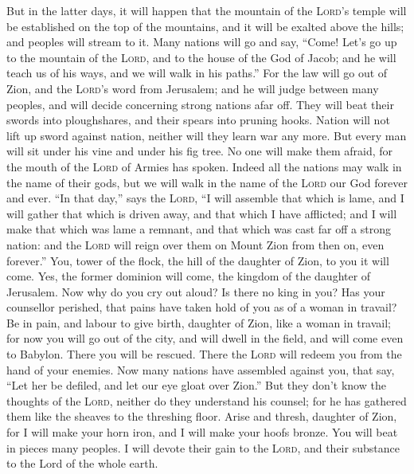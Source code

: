  But in the latter days, it will happen that the mountain
of the \textsc{Lord}'s temple will be established on the top of the
mountains, and it will be exalted above the hills; and peoples will
stream to it.  Many nations will go and say, ``Come! Let's
go up to the mountain of the \textsc{Lord}, and to the house of the God
of Jacob; and he will teach us of his ways, and we will walk in his
paths.'' For the law will go out of Zion, and the \textsc{Lord}'s word
from Jerusalem;  and he will judge between many peoples,
and will decide concerning strong nations afar off. They will beat their
swords into ploughshares, and their spears into pruning hooks. Nation
will not lift up sword against nation, neither will they learn war any
more.  But every man will sit under his vine and under his
fig tree. No one will make them afraid, for the mouth of the
\textsc{Lord} of Armies has spoken.  Indeed all the
nations may walk in the name of their gods, but we will walk in the name
of the \textsc{Lord} our God forever and ever.  ``In that
day,'' says the \textsc{Lord}, ``I will assemble that which is lame, and
I will gather that which is driven away, and that which I have
afflicted;  and I will make that which was lame a remnant,
and that which was cast far off a strong nation: and the \textsc{Lord}
will reign over them on Mount Zion from then on, even forever.''
 You, tower of the flock, the hill of the daughter of
Zion, to you it will come. Yes, the former dominion will come, the
kingdom of the daughter of Jerusalem.  Now why do you cry
out aloud? Is there no king in you? Has your counsellor perished, that
pains have taken hold of you as of a woman in travail? 
Be in pain, and labour to give birth, daughter of Zion, like a woman in
travail; for now you will go out of the city, and will dwell in the
field, and will come even to Babylon. There you will be rescued. There
the \textsc{Lord} will redeem you from the hand of your enemies.
 Now many nations have assembled against you, that say,
``Let her be defiled, and let our eye gloat over Zion.'' 
But they don't know the thoughts of the \textsc{Lord}, neither do they
understand his counsel; for he has gathered them like the sheaves to the
threshing floor.  Arise and thresh, daughter of Zion, for
I will make your horn iron, and I will make your hoofs bronze. You will
beat in pieces many peoples. I will devote their gain to the
\textsc{Lord}, and their substance to the Lord of the whole earth.

